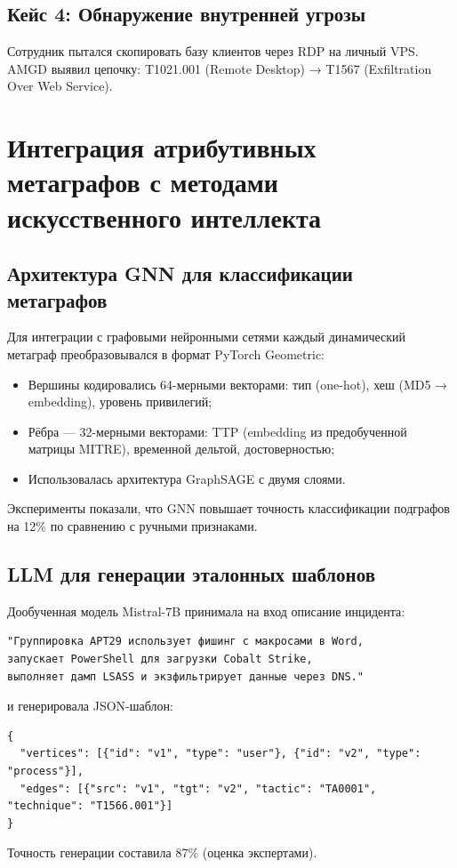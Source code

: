 \documentclass{article}
\begin{document}
\subsection{Кейс 4: Обнаружение внутренней угрозы}

Сотрудник пытался скопировать базу клиентов через RDP на личный VPS.  
AMGD выявил цепочку:  
T1021.001 (Remote Desktop) → T1567 (Exfiltration Over Web Service).

\section{Интеграция атрибутивных метаграфов с методами искусственного интеллекта}\label{sec:ch4/sect6}

\subsection{Архитектура GNN для классификации метаграфов}

Для интеграции с графовыми нейронными сетями каждый динамический метаграф преобразовывался в формат PyTorch Geometric:
\begin{itemize}
    \item Вершины кодировались 64-мерными векторами: тип (one-hot), хеш (MD5 → embedding), уровень привилегий;
    \item Рёбра — 32-мерными векторами: TTP (embedding из предобученной матрицы MITRE), временной дельтой, достоверностью;
    \item Использовалась архитектура GraphSAGE с двумя слоями.
\end{itemize}

Эксперименты показали, что GNN повышает точность классификации подграфов на 12\% по сравнению с ручными признаками.

\subsection{LLM для генерации эталонных шаблонов}

Дообученная модель Mistral-7B принимала на вход описание инцидента:
\begin{verbatim}
"Группировка APT29 использует фишинг с макросами в Word, 
запускает PowerShell для загрузки Cobalt Strike, 
выполняет дамп LSASS и экзфильтрирует данные через DNS."
\end{verbatim}
и генерировала JSON-шаблон:
\begin{verbatim}
{
  "vertices": [{"id": "v1", "type": "user"}, {"id": "v2", "type": "process"}],
  "edges": [{"src": "v1", "tgt": "v2", "tactic": "TA0001", "technique": "T1566.001"}]
}
\end{verbatim}
Точность генерации составила 87\% (оценка экспертами).
\end{document}

